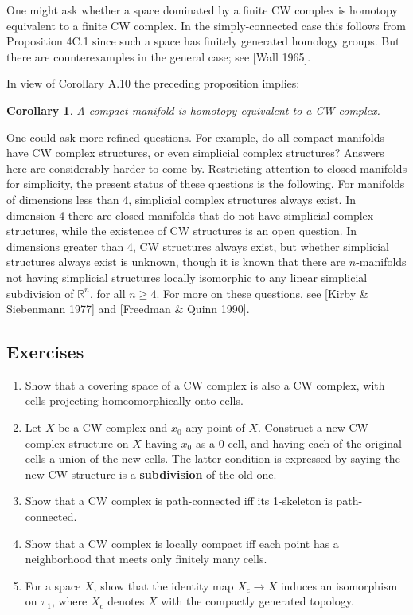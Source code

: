 \documentclass{article}
\newtheorem{corollary}[theorem]{Corollary}
\theoremstyle{definition}
\begin{document}
One might ask whether a space dominated by a finite CW complex is homotopy equivalent to a finite CW complex. In the simply-connected case this follows from Proposition 4C.1 since such a space has finitely generated homology groups. But there are counterexamples in the general case; see [Wall 1965].

In view of Corollary A.10 the preceding proposition implies:

\begin{corollary}
A compact manifold is homotopy equivalent to a CW complex.
\end{corollary}

One could ask more refined questions. For example, do all compact manifolds have CW complex structures, or even simplicial complex structures? Answers here are considerably harder to come by. Restricting attention to closed manifolds for simplicity, the present status of these questions is the following. For manifolds of dimensions less than 4, simplicial complex structures always exist. In dimension 4 there are closed manifolds that do not have simplicial complex structures, while the existence of CW structures is an open question. In dimensions greater than 4, CW structures always exist, but whether simplicial structures always exist is unknown, though it is known that there are $n$-manifolds not having simplicial structures locally isomorphic to any linear simplicial subdivision of $\mathbb{R}^n$, for all $n \geq 4$. For more on these questions, see [Kirby \& Siebenmann 1977] and [Freedman \& Quinn 1990].

\subsection*{Exercises}

\begin{enumerate}
\item Show that a covering space of a CW complex is also a CW complex, with cells projecting homeomorphically onto cells.
\item Let $X$ be a CW complex and $x_0$ any point of $X$. Construct a new CW complex structure on $X$ having $x_0$ as a 0-cell, and having each of the original cells a union of the new cells. The latter condition is expressed by saying the new CW structure is a \textbf{subdivision} of the old one.
\item Show that a CW complex is path-connected iff its 1-skeleton is path-connected.
\item Show that a CW complex is locally compact iff each point has a neighborhood that meets only finitely many cells.
\item For a space $X$, show that the identity map $X_c \rightarrow X$ induces an isomorphism on $\pi_1$, where $X_c$ denotes $X$ with the compactly generated topology.
\end{enumerate}
\end{document}
